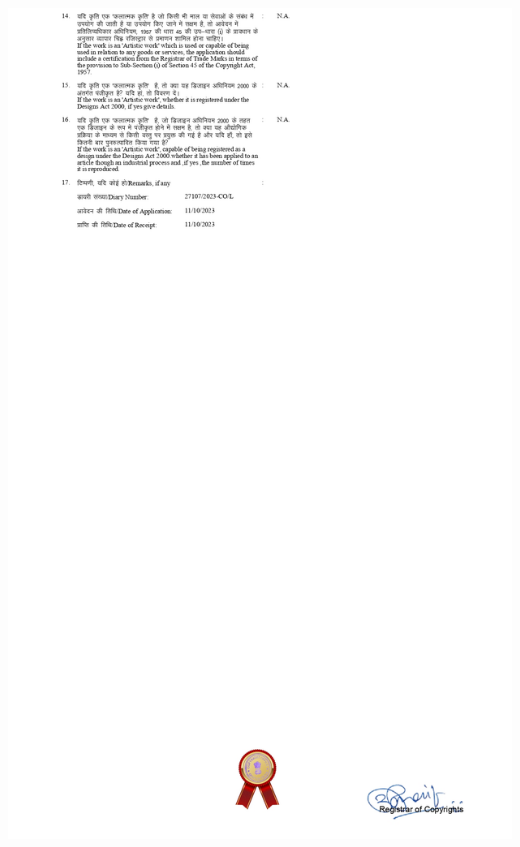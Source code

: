 \documentclass[12pt,a4paper]{report}
\begin{document}
\includegraphics[scale=0.7]{images/copyright/copyright_certificate/copyright_certificate_page-0002.jpg}
\newpage
\end{document}
